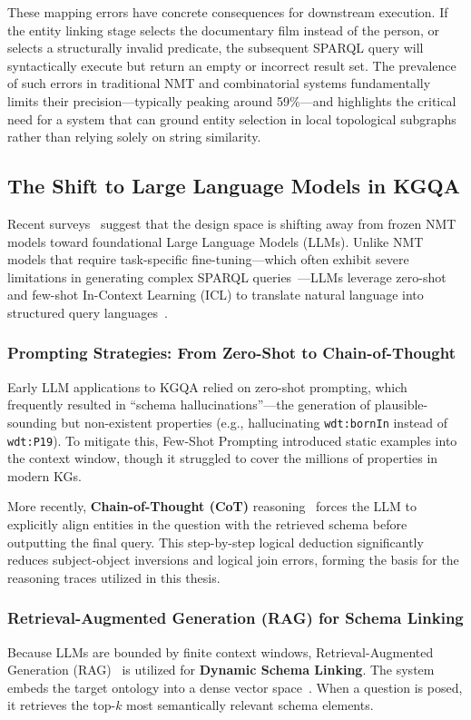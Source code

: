 These mapping errors have concrete consequences for downstream execution. If the entity linking stage selects the documentary film instead of the person, or selects a structurally invalid predicate, the subsequent SPARQL query will syntactically execute but return an empty or incorrect result set. The prevalence of such errors in traditional NMT and combinatorial systems fundamentally limits their precision—typically peaking around 59\%—and highlights the critical need for a system that can ground entity selection in local topological subgraphs rather than relying solely on string similarity.

\subsection{The Shift to Large Language Models in KGQA}
Recent surveys~\cite{perevalov_multilingual_2024, song_advancements_2023, zhang_review_2021} suggest that the design space is shifting away from frozen NMT models toward foundational Large Language Models (LLMs). Unlike NMT models that require task-specific fine-tuning—which often exhibit severe limitations in generating complex SPARQL queries~\cite{mecharnia_performance_2025}—LLMs leverage zero-shot and few-shot In-Context Learning (ICL) to translate natural language into structured query languages~\cite{dabramo_investigating_2025, meloni_exploring_2025}.

\subsubsection{Prompting Strategies: From Zero-Shot to Chain-of-Thought}
Early LLM applications to KGQA relied on zero-shot prompting, which frequently resulted in ``schema hallucinations''—the generation of plausible-sounding but non-existent properties (e.g., hallucinating \texttt{wdt:bornIn} instead of \texttt{wdt:P19}). To mitigate this, Few-Shot Prompting introduced static examples into the context window, though it struggled to cover the millions of properties in modern KGs.

More recently, \textbf{Chain-of-Thought (CoT)} reasoning~\cite{deng_recent_2022} forces the LLM to explicitly align entities in the question with the retrieved schema before outputting the final query. This step-by-step logical deduction significantly reduces subject-object inversions and logical join errors, forming the basis for the reasoning traces utilized in this thesis.

\subsubsection{Retrieval-Augmented Generation (RAG) for Schema Linking}
Because LLMs are bounded by finite context windows, Retrieval-Augmented Generation (RAG)~\cite{lewis2020rag} is utilized for \textbf{Dynamic Schema Linking}. The system embeds the target ontology into a dense vector space~\cite{hu_empirical_2023}. When a question is posed, it retrieves the top-$k$ most semantically relevant schema elements.

